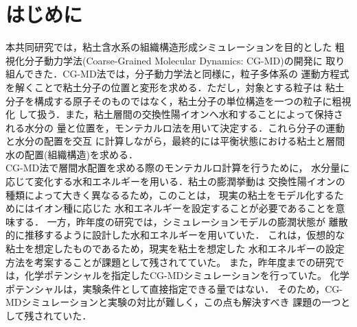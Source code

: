 \section{はじめに}
本共同研究では，粘土含水系の組織構造形成シミュレーションを目的とした
粗視化分子動力学法(Coarse-Grained Molecular Dynamics: CG-MD)の開発に
取り組んできた．CG-MD法では，分子動力学法と同様に，粒子多体系の
運動方程式を解くことで粘土分子の位置と変形を求める．ただし，対象とする粒子は
粘土分子を構成する原子そのものではなく，粘土分子の単位構造を一つの粒子に粗視化
して扱う．また，粘土層間の交換性陽イオンへ水和することによって保持される水分の
量と位置を，モンテカルロ法を用いて決定する．これら分子の運動と水分の配置を交互
に計算しながら，最終的には平衡状態における粘土と層間水の配置(組織構造)を求める．\\

CG-MD法で層間水配置を求める際のモンテカルロ計算を行うために，
水分量に応じて変化する水和エネルギーを用いる．粘土の膨潤挙動は
交換性陽イオンの種類によって大きく異なるるため，このことは，
現実の粘土をモデル化するためにはイオン種に応じた
水和エネルギーを設定することが必要であることを意味する．
一方，昨年度の研究では，シミュレーションモデルの膨潤状態が
離散的に推移するように設計した水和エネルギーを用いていた．
これは，仮想的な粘土を想定したものであるため，現実を粘土を想定した
水和エネルギーの設定方法を考案することが課題として残されてていた。
また，昨年度までの研究では，化学ポテンシャルを指定したCG-MDシミュレーションを行っていた。
化学ポテンシャルは，実験条件として直接指定できる量ではない．
そのため，CG-MDシミュレーションと実験の対比が難しく，この点も解決すべき
課題の一つとして残されていた．\\

